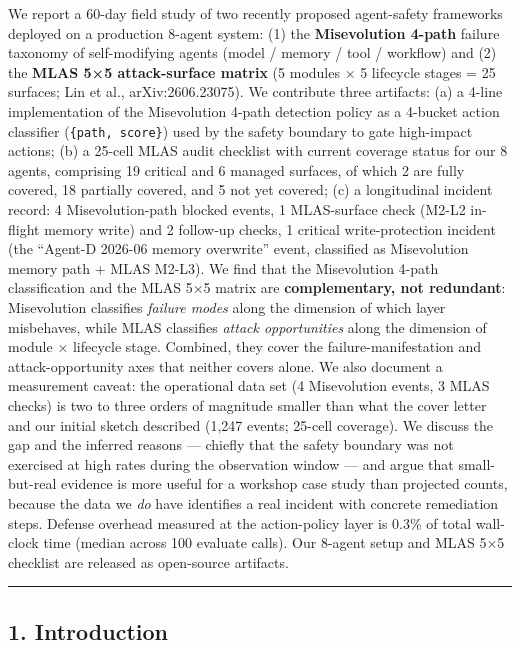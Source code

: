 We report a 60-day field study of two recently proposed agent-safety
frameworks deployed on a production 8-agent system: (1) the
\textbf{Misevolution 4-path} failure taxonomy of self-modifying agents
(model / memory / tool / workflow) and (2) the \textbf{MLAS 5×5
attack-surface matrix} (5 modules × 5 lifecycle stages = 25 surfaces;
Lin et al., arXiv:2606.23075). We contribute three artifacts: (a) a
4-line implementation of the Misevolution 4-path detection policy as a
4-bucket action classifier (\texttt{\{path,\ score\}}) used by the
safety boundary to gate high-impact actions; (b) a 25-cell MLAS audit
checklist with current coverage status for our 8 agents, comprising 19
critical and 6 managed surfaces, of which 2 are fully covered, 18
partially covered, and 5 not yet covered; (c) a longitudinal incident
record: 4 Misevolution-path blocked events, 1 MLAS-surface check (M2-L2
in-flight memory write) and 2 follow-up checks, 1 critical
write-protection incident (the ``Agent-D 2026-06 memory overwrite''
event, classified as Misevolution memory path + MLAS M2-L3). We find
that the Misevolution 4-path classification and the MLAS 5×5 matrix are
\textbf{complementary, not redundant}: Misevolution classifies
\emph{failure modes} along the dimension of which layer misbehaves,
while MLAS classifies \emph{attack opportunities} along the dimension of
module × lifecycle stage. Combined, they cover the failure-manifestation
and attack-opportunity axes that neither covers alone. We also document
a measurement caveat: the operational data set (4 Misevolution events, 3
MLAS checks) is two to three orders of magnitude smaller than what the
cover letter and our initial sketch described (1,247 events; 25-cell
coverage). We discuss the gap and the inferred reasons --- chiefly that
the safety boundary was not exercised at high rates during the
observation window --- and argue that small-but-real evidence is more
useful for a workshop case study than projected counts, because the data
we \emph{do} have identifies a real incident with concrete remediation
steps. Defense overhead measured at the action-policy layer is 0.3\% of
total wall-clock time (median across 100 evaluate calls). Our 8-agent
setup and MLAS 5×5 checklist are released as open-source artifacts.

\begin{center}\rule{0.5\linewidth}{0.5pt}\end{center}

\subsection{1. Introduction}\label{introduction}

